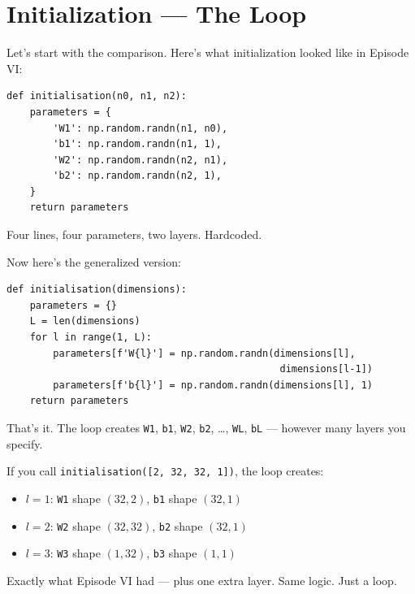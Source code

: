 \documentclass[11pt]{article}
\begin{document}
\section{Initialization --- The Loop}

Let's start with the comparison. Here's what initialization looked like in Episode VI:

\begin{lstlisting}[title={\small Episode VI --- Hardcoded for 2 layers}]
def initialisation(n0, n1, n2):
    parameters = {
        'W1': np.random.randn(n1, n0),
        'b1': np.random.randn(n1, 1),
        'W2': np.random.randn(n2, n1),
        'b2': np.random.randn(n2, 1),
    }
    return parameters
\end{lstlisting}

Four lines, four parameters, two layers. Hardcoded.

Now here's the generalized version:

\begin{lstlisting}[title={\small Episode VII --- Any number of layers}]
def initialisation(dimensions):
    parameters = {}
    L = len(dimensions)
    for l in range(1, L):
        parameters[f'W{l}'] = np.random.randn(dimensions[l],
                                               dimensions[l-1])
        parameters[f'b{l}'] = np.random.randn(dimensions[l], 1)
    return parameters
\end{lstlisting}

That's it. The loop creates \texttt{W1}, \texttt{b1}, \texttt{W2}, \texttt{b2}, \ldots, \texttt{WL}, \texttt{bL} --- however many layers you specify.

\begin{insightbox}[title={Same Logic, Different Scale}]
If you call \texttt{initialisation([2, 32, 32, 1])}, the loop creates:
\begin{itemize}
  \item $l=1$: \texttt{W1} shape $(32, 2)$, \texttt{b1} shape $(32, 1)$
  \item $l=2$: \texttt{W2} shape $(32, 32)$, \texttt{b2} shape $(32, 1)$
  \item $l=3$: \texttt{W3} shape $(1, 32)$, \texttt{b3} shape $(1, 1)$
\end{itemize}
Exactly what Episode VI had --- plus one extra layer. Same logic. Just a loop.
\end{insightbox}
\end{document}
